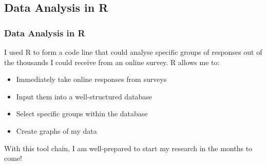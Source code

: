 \documentclass[aspectratio=169]{beamer}
\begin{document}
\subsection{Data Analysis in R}
\begin{frame}
\frametitle{Data Analysis in R}
I used R to form a code line that could analyse specific groups of responses out of the thousands I could receive from an online survey.
R allows me to:
\begin{itemize}
\item Immediately take online responses from surveys
\item Input them into a well-structured database
\item Select specific groups within the database
\item Create graphs of my data
\end{itemize}
With this tool chain, I am well-prepared to start my research in the months to come!
 \end{frame}
 
\end{document}
